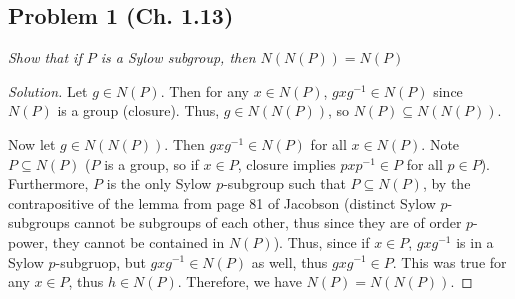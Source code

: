 \documentclass{article}
\begin{document}
\subsection*{Problem 1 (Ch. 1.13)}
{\it Show that if $P$ is a Sylow subgroup, then $N(N(P)) = N(P)$}
\begin{proof}[Solution]\let\qed\relax
	Let $g \in N(P)$.
	Then for any $x \in N(P)$, $gxg^{-1} \in N(P)$ since $N(P)$ is a group (closure).
	Thus, $g \in N(N(P))$,
	so $N(P) \subseteq N(N(P))$.
	
	Now let $g \in N(N(P))$.
	Then $gxg^{-1} \in N(P)$ for all $x \in N(P)$.
	Note $P \subseteq N(P)$ ($P$ is a group, so if $x \in P$,
	closure implies $pxp^{-1} \in P$ for all $p \in P$).
	Furthermore, $P$ is the only Sylow $p$-subgroup such that $P \subseteq N(P)$,
	by the contrapositive of the lemma from page 81 of Jacobson
	(distinct Sylow $p$-subgroups cannot be subgroups of each other,
	thus since they are of order $p$-power, they cannot be contained in $N(P)$).
	Thus, since if $x \in P$, $gxg^{-1}$ is in a Sylow $p$-subgruop,
	but $gxg^{-1} \in N(P)$ as well, thus $gxg^{-1} \in P$.
	This was true for any $x \in P$, thus $h \in N(P)$.
	Therefore, we have $N(P) = N(N(P))$.
\end{proof}
\end{document}
